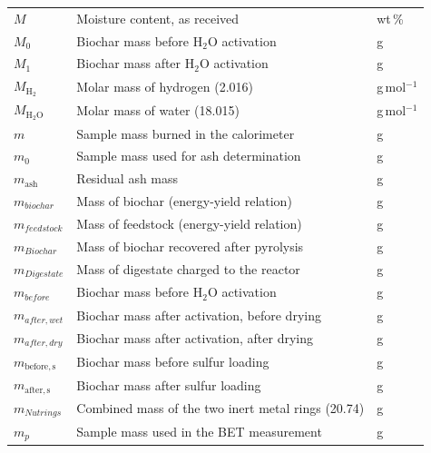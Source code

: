 {\begin{longtable}{L{3cm}L{9.2cm}L{2.5cm}}
\(M\)                        & Moisture content, as received                                   & wt\,\%\\
\(M_0\)                      & Biochar mass before H$_2$O activation                           & g\\
\(M_1\)                      & Biochar mass after H$_2$O activation                            & g\\
\(M_{\mathrm{H_2}}\)         & Molar mass of hydrogen (2.016)                                  & g\,mol$^{-1}$\\
\(M_{\mathrm{H_2O}}\)        & Molar mass of water (18.015)                                    & g\,mol$^{-1}$\\
\(m\)                        & Sample mass burned in the calorimeter                           & g\\
\(m_0\)                      & Sample mass used for ash determination                          & g\\
\(m_{\mathrm{ash}}\)         & Residual ash mass                                               & g\\
\(m_{biochar}\)              & Mass of biochar (energy-yield relation)                         & g\\
\(m_{feedstock}\)            & Mass of feedstock (energy-yield relation)                       & g\\
\(m_{Biochar}\)              & Mass of biochar recovered after pyrolysis                       & g\\
\(m_{Digestate}\)            & Mass of digestate charged to the reactor                        & g\\
\(m_{before}\)               & Biochar mass before H$_2$O activation                           & g\\
\(m_{after,wet}\)            & Biochar mass after activation, before drying                    & g\\
\(m_{after,dry}\)            & Biochar mass after activation, after drying                     & g\\
\(m_{\mathrm{before,s}}\)    & Biochar mass before sulfur loading                              & g\\
\(m_{\mathrm{after,s}}\)     & Biochar mass after sulfur loading                               & g\\
\(m_{Nutrings}\)             & Combined mass of the two inert metal rings (20.74)              & g\\
\(m_p\)                      & Sample mass used in the BET measurement                         & g\\

\end{longtable}}
